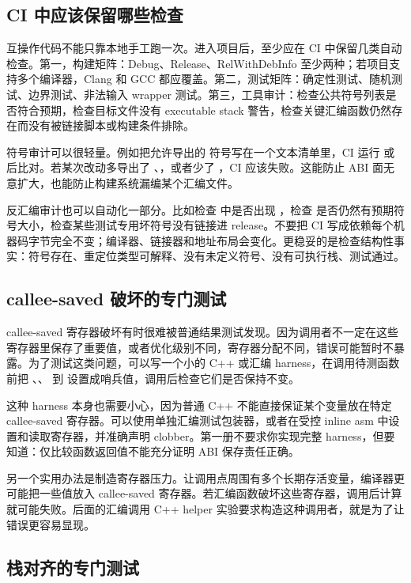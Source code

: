 \subsection{CI 中应该保留哪些检查}

互操作代码不能只靠本地手工跑一次。进入项目后，至少应在 CI 中保留几类自动检查。第一，构建矩阵：Debug、Release、RelWithDebInfo 至少两种；若项目支持多个编译器，Clang 和 GCC 都应覆盖。第二，测试矩阵：确定性测试、随机测试、边界测试、非法输入 wrapper 测试。第三，工具审计：检查公共符号列表是否符合预期，检查目标文件没有 executable stack 警告，检查关键汇编函数仍然存在而没有被链接脚本或构建条件排除。

符号审计可以很轻量。例如把允许导出的  符号写在一个文本清单里，CI 运行  或  后比对。若某次改动多导出了 、，或者少了 ，CI 应该失败。这能防止 ABI 面无意扩大，也能防止构建系统漏编某个汇编文件。

反汇编审计也可以自动化一部分。比如检查  中是否出现 ，检查  是否仍然有预期符号大小，检查某些测试专用坏符号没有链接进 release。不要把 CI 写成依赖每个机器码字节完全不变；编译器、链接器和地址布局会变化。更稳妥的是检查结构性事实：符号存在、重定位类型可解释、没有未定义符号、没有可执行栈、测试通过。

\subsection{callee-saved 破坏的专门测试}

callee-saved 寄存器破坏有时很难被普通结果测试发现。因为调用者不一定在这些寄存器里保存了重要值，或者优化级别不同，寄存器分配不同，错误可能暂时不暴露。为了测试这类问题，可以写一个小的 C++ 或汇编 harness，在调用待测函数前把 、、 到  设置成哨兵值，调用后检查它们是否保持不变。

这种 harness 本身也需要小心，因为普通 C++ 不能直接保证某个变量放在特定 callee-saved 寄存器。可以使用单独汇编测试包装器，或者在受控 inline asm 中设置和读取寄存器，并准确声明 clobber。第一册不要求你实现完整 harness，但要知道：仅比较函数返回值不能充分证明 ABI 保存责任正确。

另一个实用办法是制造寄存器压力。让调用点周围有多个长期存活变量，编译器更可能把一些值放入 callee-saved 寄存器。若汇编函数破坏这些寄存器，调用后计算就可能失败。后面的汇编调用 C++ helper 实验要求构造这种调用者，就是为了让错误更容易显现。

\subsection{栈对齐的专门测试}

